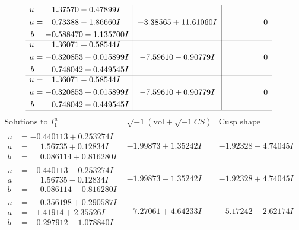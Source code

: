 \documentclass[1p]{elsarticle_modified}
\theoremstyle{definition}
\newcommand{\I}{\sqrt{-1}}
\begin{document}
$$\begin{array}{c|c|c}
\begin{aligned}
u &= \phantom{-}1.37570 - 0.47899 I \\
a &= \phantom{-}0.73388 - 1.86660 I \\
b &= -0.588470 - 1.135700 I\end{aligned}
 & -3.38565 + 11.61060 I & \phantom{-0.000000 } 0 \\ \hline\begin{aligned}
u &= \phantom{-}1.36071 + 0.58544 I \\
a &= -0.320853 - 0.015899 I \\
b &= \phantom{-}0.748042 + 0.449545 I\end{aligned}
 & -7.59610 - 0.90779 I & \phantom{-0.000000 } 0 \\ \hline\begin{aligned}
u &= \phantom{-}1.36071 - 0.58544 I \\
a &= -0.320853 + 0.015899 I \\
b &= \phantom{-}0.748042 - 0.449545 I\end{aligned}
 & -7.59610 + 0.90779 I & \phantom{-0.000000 } 0\\
 \hline 
 \end{array}$$\newpage$$\begin{array}{c|c|c}  
\text{Solutions to }I^u_{1}& \I (\text{vol} + \sqrt{-1}CS) & \text{Cusp shape}\\
 \hline 
\begin{aligned}
u &= -0.440113 + 0.253274 I \\
a &= \phantom{-}1.56735 + 0.12834 I \\
b &= \phantom{-}0.086114 + 0.816280 I\end{aligned}
 & -1.99873 + 1.35242 I & -1.92328 - 4.74045 I \\ \hline\begin{aligned}
u &= -0.440113 - 0.253274 I \\
a &= \phantom{-}1.56735 - 0.12834 I \\
b &= \phantom{-}0.086114 - 0.816280 I\end{aligned}
 & -1.99873 - 1.35242 I & -1.92328 + 4.74045 I \\ \hline\begin{aligned}
u &= \phantom{-}0.356198 + 0.290587 I \\
a &= -1.41914 + 2.35526 I \\
b &= -0.297912 - 1.078840 I\end{aligned}
 & -7.27061 + 4.64233 I & -5.17242 - 2.62174 I \\ \hline\begin{aligned}

\end{aligned}
\end{array}$$
\end{document}
